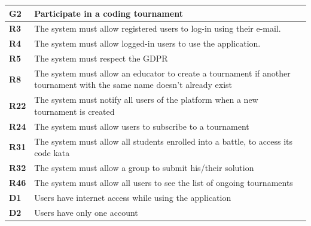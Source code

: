 \documentclass[../RASD.tex]{subfiles}
\begin{document}
        \begin{table}[ht]
            \begin{center}
                \begin{tabular}{|m{2em}|m{30em}|}
                \hline
                \rowcolor{ReqMappingRow1}
                \textbf{G2} & \textbf{Participate in a coding tournament}\\
                \hline
                \cellcolor{ReqMappingCell2}
                \textbf{R3} & The system must allow registered users to log-in using their e-mail.\\
                \hline
                \cellcolor{ReqMappingCell2}
                \textbf{R4} & The system must allow logged-in users to use the application.\\
                \hline
                \cellcolor{ReqMappingCell2}
                \textbf{R5} & The system must respect the GDPR\\
                \hline
                \cellcolor{ReqMappingCell2}
                \textbf{R8} & The system must allow an educator to create a tournament if another tournament with the same name doesn't already exist\\
                \hline
                \cellcolor{ReqMappingCell2}
                \textbf{R22} & The system must notify all users of the platform when a new tournament is created\\
                \hline
                \cellcolor{ReqMappingCell2}
                \textbf{R24} & The system must allow users to subscribe to a tournament\\
                \hline
                \cellcolor{ReqMappingCell2}
                \textbf{R31} & The system must allow all students enrolled into a battle, to access its code kata\\
                \hline
                \cellcolor{ReqMappingCell2}
                \textbf{R32} & The system must allow a group to submit his/their solution\\
                \hline
                \cellcolor{ReqMappingCell2}
                \textbf{R46} & The system must allow all users to see the list of ongoing tournaments\\
                \hline
                \cellcolor{ReqMappingCell3}
                \textbf{D1} & Users have internet access while using the application\\
                \hline
                \cellcolor{ReqMappingCell3}
                \textbf{D2} & Users have only one account\\

\end{tabular}
\end{center}
\end{table}
\end{document}
